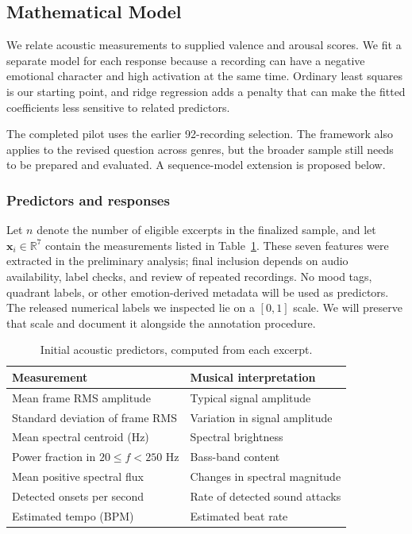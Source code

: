 \subsection{Mathematical Model}
\label{sec:model}

We relate acoustic measurements to supplied valence and arousal scores. We fit a separate model for each response because a recording can have a negative emotional character and high activation at the same time. Ordinary least squares is our starting point, and ridge regression adds a penalty that can make the fitted coefficients less sensitive to related predictors.

The completed pilot uses the earlier 92-recording selection. The framework also applies to the revised question across genres, but the broader sample still needs to be prepared and evaluated. A sequence-model extension is proposed below.

\subsubsection{Predictors and responses}
Let $n$ denote the number of eligible excerpts in the finalized sample, and let $\bm{x}_i\in\mathbb{R}^7$ contain the measurements listed in Table~\ref{tab:predictors}. These seven features were extracted in the preliminary analysis; final inclusion depends on audio availability, label checks, and review of repeated recordings. No mood tags, quadrant labels, or other emotion-derived metadata will be used as predictors. The released numerical labels we inspected lie on a $[0,1]$ scale. We will preserve that scale and document it alongside the annotation procedure.

\begin{table}[ht]
\centering
\caption{Initial acoustic predictors, computed from each excerpt.}
\label{tab:predictors}
\begin{tabular}{ll}
\toprule
Measurement & Musical interpretation \\
\midrule
Mean frame RMS amplitude & Typical signal amplitude \\
Standard deviation of frame RMS & Variation in signal amplitude \\
Mean spectral centroid (Hz) & Spectral brightness \\
Power fraction in $20\leq f<250$ Hz & Bass-band content \\
Mean positive spectral flux & Changes in spectral magnitude \\
Detected onsets per second & Rate of detected sound attacks \\
Estimated tempo (BPM) & Estimated beat rate \\
\bottomrule
\end{tabular}
\end{table}

